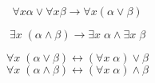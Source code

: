 \begin{frame}{}
  \[
    \forall x \alpha \lor \forall x \beta \to \forall x (\alpha \lor \beta)
  \]

  \[
    \exists x\; (\alpha \land \beta) \to \exists x\; \alpha \land \exists x\; \beta
  \]
\end{frame}

\begin{frame}{}

  \[
    \forall x\; (\alpha \lor \beta) \leftrightarrow (\forall x\; \alpha) \lor \beta
  \]
  \[
    \forall x\; (\alpha \land \beta) \leftrightarrow (\forall x\; \alpha) \land \beta
  \]

\end{frame}
